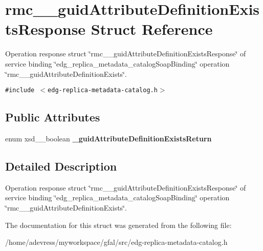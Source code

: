 \section{rmc\_\-\_\-guid\-Attribute\-Definition\-Exists\-Response Struct Reference}
\label{structrmc____guidAttributeDefinitionExistsResponse}
Operation response struct \char`\"{}rmc\_\-\_\-guid\-Attribute\-Definition\-Exists\-Response\char`\"{} of service binding \char`\"{}edg\_\-replica\_\-metadata\_\-catalog\-Soap\-Binding\char`\"{} operation \char`\"{}rmc\_\-\_\-guid\-Attribute\-Definition\-Exists\char`\"{}.  


{\tt \#include $<$edg-replica-metadata-catalog.h$>$}

\subsection*{Public Attributes}
\begin{CompactItemize}
\item 
enum xsd\_\-\_\-boolean \textbf{\_\-guid\-Attribute\-Definition\-Exists\-Return}\label{structrmc____guidAttributeDefinitionExistsResponse_13b5f6da8e8af041cd953c68d846ab7b}

\end{CompactItemize}


\subsection{Detailed Description}
Operation response struct \char`\"{}rmc\_\-\_\-guid\-Attribute\-Definition\-Exists\-Response\char`\"{} of service binding \char`\"{}edg\_\-replica\_\-metadata\_\-catalog\-Soap\-Binding\char`\"{} operation \char`\"{}rmc\_\-\_\-guid\-Attribute\-Definition\-Exists\char`\"{}. 



The documentation for this struct was generated from the following file:\begin{CompactItemize}
\item 
/home/adevress/myworkspace/gfal/src/edg-replica-metadata-catalog.h\end{CompactItemize}
